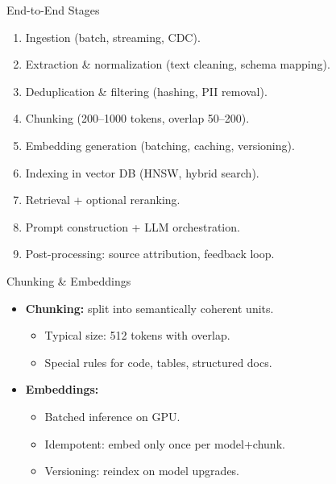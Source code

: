 \documentclass{beamer}
\begin{document}

\begin{frame}{End-to-End Stages}
\begin{enumerate}
    \item Ingestion (batch, streaming, CDC).
    \item Extraction \& normalization (text cleaning, schema mapping).
    \item Deduplication \& filtering (hashing, PII removal).
    \item Chunking (200--1000 tokens, overlap 50--200).
    \item Embedding generation (batching, caching, versioning).
    \item Indexing in vector DB (HNSW, hybrid search).
    \item Retrieval + optional reranking.
    \item Prompt construction + LLM orchestration.
    \item Post-processing: source attribution, feedback loop.
\end{enumerate}
\end{frame}


\begin{frame}{Chunking \& Embeddings}
\begin{itemize}
    \item \textbf{Chunking:} split into semantically coherent units.
    \begin{itemize}
        \item Typical size: 512 tokens with overlap.
        \item Special rules for code, tables, structured docs.
    \end{itemize}
    \item \textbf{Embeddings:}
    \begin{itemize}
        \item Batched inference on GPU.
        \item Idempotent: embed only once per model+chunk.
        \item Versioning: reindex on model upgrades.
    \end{itemize}
\end{itemize}
\end{frame}

\end{document}
